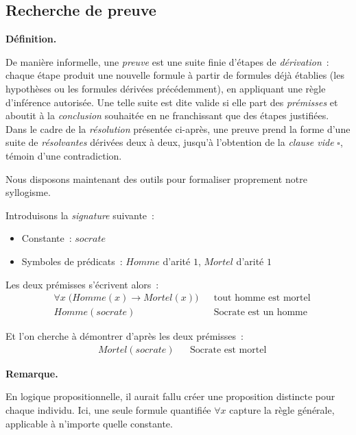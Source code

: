 \documentclass[11pt]{article}
\newenvironment{paraph}[1]{%
  \medskip
  \noindent\textbf{#1.}\quad

  \vspace{0.2cm}
}{%
  \medskip
}
\newenvironment{remarque}{%
    \begin{mdframed}[
        linecolor=sectioncolor!40,
        linewidth=0.8pt,
        backgroundcolor=sectioncolor!5,
        innerleftmargin=10pt,
        innerrightmargin=10pt,
        innertopmargin=6pt,
        innerbottommargin=6pt,
        skipabove=8pt,
        skipbelow=8pt
    ]
    \noindent\textbf{\small\color{sectioncolor}Remarque.}\enspace\small\itshape
}{%
    \end{mdframed}
}
\begin{document}
\subsection{Recherche de preuve}
\begin{paraph}{Définition}
De manière informelle, une \textit{preuve} est une suite finie d'étapes de 
\textit{dérivation}~: chaque étape produit une nouvelle formule à partir de 
formules déjà établies (les hypothèses ou les formules dérivées précédemment), 
en appliquant une règle d'inférence autorisée. Une telle suite est dite valide 
si elle part des \textit{prémisses} et aboutit à la \textit{conclusion} souhaitée 
en ne franchissant que des étapes justifiées. Dans le cadre de la \textit{résolution} 
présentée ci-après, une preuve prend la forme d'une suite de \textit{résolvantes} 
dérivées deux à deux, jusqu'à l'obtention de la \textit{clause vide} $\square$, 
témoin d'une contradiction.
\end{paraph}

Nous disposons maintenant des outils pour formaliser proprement notre syllogisme.

Introduisons la \textit{signature} suivante~:
\begin{itemize}
    \item Constante~: $\mathit{socrate}$
    \item Symboles de prédicats~: $\mathit{Homme}$ d'arité $1$, $\mathit{Mortel}$ d'arité $1$
\end{itemize}

Les deux prémisses s'écrivent alors~:
\begin{align*}
    &\forall x\; \bigl(\mathit{Homme}(x) \rightarrow \mathit{Mortel}(x)\bigr) 
    &&\text{tout homme est mortel} \\
    &\mathit{Homme}(\mathit{socrate}) 
    &&\text{Socrate est un homme}
\end{align*}

Et l'on cherche à démontrer d'après les deux prémisses~:
\begin{align*}
    &\mathit{Mortel}(\mathit{socrate})
    &&\text{Socrate est mortel}
\end{align*}

\begin{remarque}
    En logique propositionnelle, il aurait fallu créer une proposition distincte pour chaque
    individu. Ici, une seule formule quantifiée $\forall x$ capture la règle générale,
    applicable à n'importe quelle constante.
\end{remarque}
\end{document}
